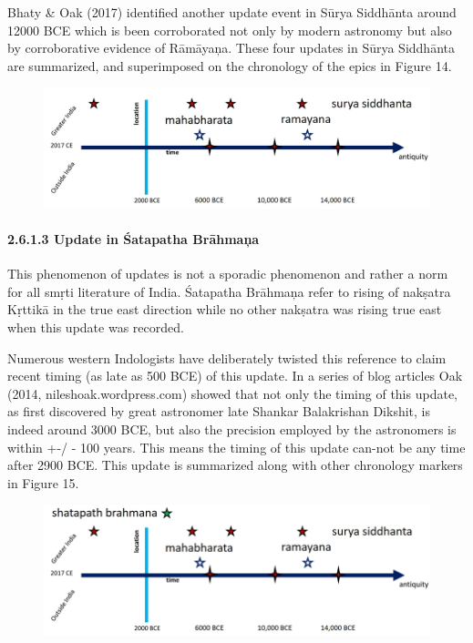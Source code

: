 Bhaty \& Oak (2017) identified another update event in Sūrya Siddhānta around 12000 BCE which is been corroborated not only by modern astronomy but also by corroborative evidence of Rāmāyaņa. These four updates in Sūrya Siddhānta are summarized, and superimposed on the chronology of the epics in Figure 14.

\begin{figure}[!htbp]
\includegraphics[scale=0.2]{"images/8-14.jpg"}
\caption{}\label{art8-fig14}
\end{figure}


\paragraph*{2.6.1.3 Update in Śatapatha Brāhmaņa}

This phenomenon of updates is not a sporadic phenomenon and rather a norm for all smṛti literature of India. Śatapatha Brāhmaņa refer to rising of nakṣatra Kṛttikā in the true east direction while no other nakṣatra was rising true east when this update was recorded.

Numerous western Indologists have deliberately twisted this reference to claim recent timing (as late as 500 BCE) of this update. In a series of blog articles Oak (2014, nileshoak.wordpress.com) showed that not only the timing of this update, as first discovered by great astronomer late Shankar Balakrishan Dikshit, is indeed around 3000 BCE, but also the precision employed by the astronomers is within +-/ - 100 years. This means the timing of this update can-not be any time after 2900 BCE. This update is summarized along with other chronology markers in Figure 15.

\begin{figure}[!htbp]
\includegraphics[scale=0.3]{"images/8-15.jpg"}
\caption{}\label{art8-fig15}
\end{figure}


